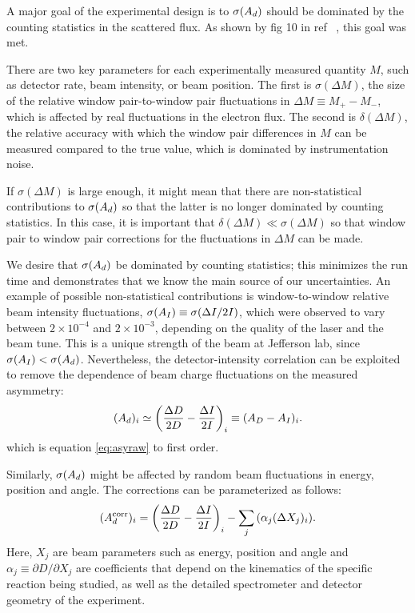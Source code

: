 A major goal of the experimental design is to $\sigma(A_d)$ should be
dominated by the counting statistics in the scattered flux.
As shown by fig 10 in ref ~\cite{pvdis_nim}, this goal was met.

There are two key parameters for each experimentally measured
quantity $M$, such as detector rate, beam intensity, or beam position. 
The first is $\sigma(\Delta M)$, the size of the relative 
window pair-to-window pair
fluctuations in $\Delta M\equiv M_{+} - M_{-}$, which is affected by
real fluctuations in the electron flux. The second is
$\delta(\Delta M)$, the relative accuracy with which the window
pair differences in $M$ can be measured compared to the true
value, which is dominated by instrumentation noise.

If $\sigma(\Delta M)$ is large enough, it might mean that there
are non-statistical contributions to $\sigma(A_d)$ so that the
latter is no longer dominated by counting statistics. In this
case, it is important that $\delta(\Delta M)\ll\sigma(\Delta M)$ so
that window pair to window pair corrections for the fluctuations
in $\Delta M$ can be made.

We desire that $\sigma(A_d)$ be dominated by counting statistics;
this minimizes the run time and demonstrates that we know
the main source of our uncertainties.
An example of possible non-statistical contributions
is window-to-window relative beam intensity
fluctuations, $\sigma(A_I) \equiv \sigma(\Delta I/2I)$,
which were observed to vary between $2\times 10^{-4}$ and
$2\times 10^{-3}$, depending on the quality of the laser and the
beam tune. This is a unique strength of the beam at 
Jefferson lab, since $\sigma(A_I)<\sigma(A_d)$. 
Nevertheless, the
detector-intensity correlation can be exploited to remove the
dependence of beam charge fluctuations on the measured asymmetry:
\begin{equation}
(A_d)_i \simeq
\left(\frac{\Delta D}{2D} - \frac{\Delta I}{2I}\right)_i \equiv
(A_D - A_I)_i.
\end{equation}
which is equation \ref{eq:asyraw} to first order.

Similarly, $\sigma(A_d)$ might be affected by random beam
fluctuations in energy, position and angle. The corrections can be
parameterized as follows:
\begin{equation}
(A^{\rm corr}_d)_i = \left(\frac{\Delta D}{2D} - \frac{\Delta I}{2I}\right)_i
-\sum_j{\left( {\alpha_j(\Delta X_j)_i}\right)}.
\end{equation}
Here, $X_j$ are beam parameters such as energy, position and
angle and $\alpha_j \equiv \partial D/\partial X_j$ are
coefficients that depend on the kinematics of the specific
reaction being studied, as well as the detailed spectrometer and
detector geometry of the experiment.

